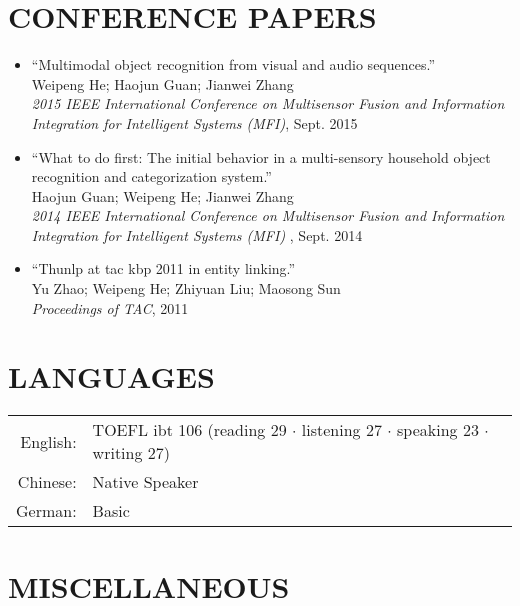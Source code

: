 \documentclass[a4paper,11pt]{article} %
\begin{document}
\section{CONFERENCE PAPERS}
\begin{itemize}
  \item ``Multimodal object recognition from visual and audio sequences.'' \\
    Weipeng He; Haojun Guan; Jianwei Zhang \\
    \textit{2015 IEEE International Conference on Multisensor Fusion and Information Integration for Intelligent Systems (MFI)}, Sept. 2015 

  \item ``What to do first: The initial behavior in a multi-sensory household object recognition and categorization system.'' \\
    Haojun Guan; Weipeng He; Jianwei Zhang \\
    \textit{2014 IEEE International Conference on Multisensor Fusion and Information Integration for Intelligent Systems (MFI)} , Sept. 2014

  \item ``Thunlp at tac kbp 2011 in entity linking.'' \\
    Yu Zhao; Weipeng He; Zhiyuan Liu; Maosong Sun \\
    \textit{Proceedings of TAC}, 2011
\end{itemize}


\section{LANGUAGES}

\begin{tabular}{rl}
  English: & TOEFL ibt 106 (reading 29 $\cdotp$ listening 27 $\cdotp$ speaking 23 $\cdotp$ writing 27) \\
  Chinese: & Native Speaker \\
  German: & Basic \\
\end{tabular}

\section{MISCELLANEOUS}
\end{document}
